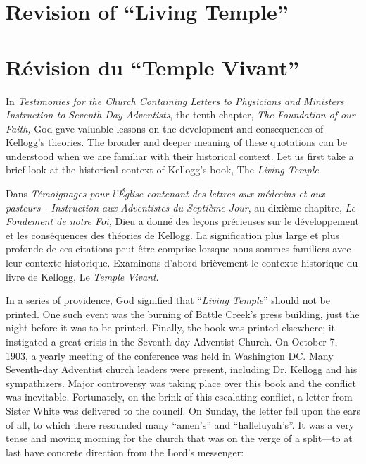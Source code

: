 \chapter{Revision of “Living Temple”}


\chapter{Révision du “Temple Vivant”}


In \textit{Testimonies for the Church Containing Letters to Physicians and Ministers Instruction to Seventh-Day Adventists}, the tenth chapter, \textit{The Foundation of our Faith,} God gave valuable lessons on the development and consequences of Kellogg's theories. The broader and deeper meaning of these quotations can be understood when we are familiar with their historical context. Let us first take a brief look at the historical context of Kellogg's book, The \textit{Living Temple}.


Dans \textit{Témoignages pour l'Église contenant des lettres aux médecins et aux pasteurs - Instruction aux Adventistes du Septième Jour}, au dixième chapitre, \textit{Le Fondement de notre Foi,} Dieu a donné des leçons précieuses sur le développement et les conséquences des théories de Kellogg. La signification plus large et plus profonde de ces citations peut être comprise lorsque nous sommes familiers avec leur contexte historique. Examinons d'abord brièvement le contexte historique du livre de Kellogg, Le \textit{Temple Vivant}.


In a series of providence, God signified that “\textit{Living Temple}” should not be printed. One such event was the burning of Battle Creek's press building, just the night before it was to be printed. Finally, the book was printed elsewhere; it instigated a great crisis in the Seventh-day Adventist Church. On October 7, 1903, a yearly meeting of the conference was held in Washington DC. Many Seventh-day Adventist church leaders were present, including Dr. Kellogg and his sympathizers. Major controversy was taking place over this book and the conflict was inevitable. Fortunately, on the brink of this escalating conflict, a letter from Sister White was delivered to the council. On Sunday, the letter fell upon the ears of all, to which there resounded many “amen's” and “halleluyah's”. It was a very tense and moving morning for the church that was on the verge of a split—to at last have concrete direction from the Lord's messenger:


